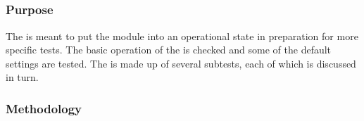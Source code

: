 \subsection{\pretest}
\label{ss:pretest}

\subsubsection{Purpose}

The \pretest is meant to put the module into an operational state in preparation for more specific tests.
The basic operation of the \roc is checked and some of the default \dac settings are tested.
The \pretest is made up of several subtests, each of which is discussed in turn.

\subsubsection{Methodology}

